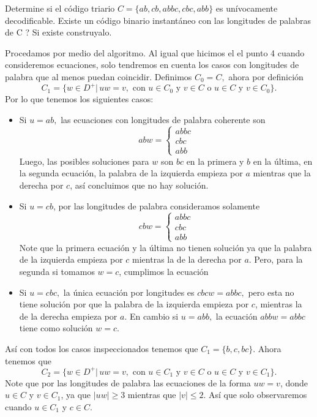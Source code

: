 
Determine si el código triario $C = \{ab, cb, abbc, cbc, abb\}$ es unívocamente decodificable. Existe un código binario instantáneo con las longitudes de palabras de C ? Si existe construyalo.

\begin{sols}
    Procedamos por medio del algoritmo. Al igual que hicimos el el punto 4 cuando consideremos ecuaciones, solo tendremos en cuenta los casos con longitudes de palabra que al menos puedan coincidir. Definimos $C_0=C,$ ahora por definición
    $$C_1=\{w\in D^+|\,uw=v, \text{ con } u\in C_0 \text{ y } v\in C \text{ o } u\in C \text{ y } v\in C_0 \}.$$
    Por lo que tenemos los siguientes casos:
    \begin{itemize}
        \item Si $u=ab,$ las ecuaciones con longitudes de palabra coherente son
        $$abw=\begin{cases}
            abbc\\
            cbc\\
            abb
        \end{cases}$$ 
        Luego, las posibles soluciones para $w$ son $bc$ en la primera y $b$ en la última, en la segunda ecuación, la palabra de la izquierda empieza por $a$ mientras que la derecha por $c$, así concluimos que no hay solución.
        \item Si $u=cb$, por las longitudes de palabra consideramos solamente
        $$cbw=\begin{cases}
            abbc\\
            cbc\\
            abb
        \end{cases}$$
        Note que la primera ecuación y la última no tienen solución ya que la palabra de la izquierda empieza por $c$ mientras la de la derecha por $a.$ Pero, para la segunda si tomamos $w=c$, cumplimos la ecuación
        \item Si $u=cbc,$ la única ecuación por longitudes es $cbcw=abbc,$ pero esta no tiene solución por que la palabra de la izquierda empieza por $c$, mientras la de la derecha empieza por $a$. En cambio si $u=abb,$ la ecuación $abbw=abbc$ tiene como solución $w=c.$
    \end{itemize}
    Así con todos los casos inspeccionados tenemos que $C_1=\{b,c,bc\}.$ Ahora tenemos que 
    $$C_2=\{w\in D^+|\,uw=v, \text{ con } u\in C_1 \text{ y } v\in C \text{ o } u\in C \text{ y } v\in C_1 \}.$$
    Note que por las longitudes de palabra las ecuaciones de la forma $uw=v$, donde $u\in C$ y $v\in C_1$, ya que $|uw|\geq 3$ mientras que $|v|\leq 2.$ Así que solo observaremos cuando $u\in C_1$ y $c\in C$.

\end{sols}
